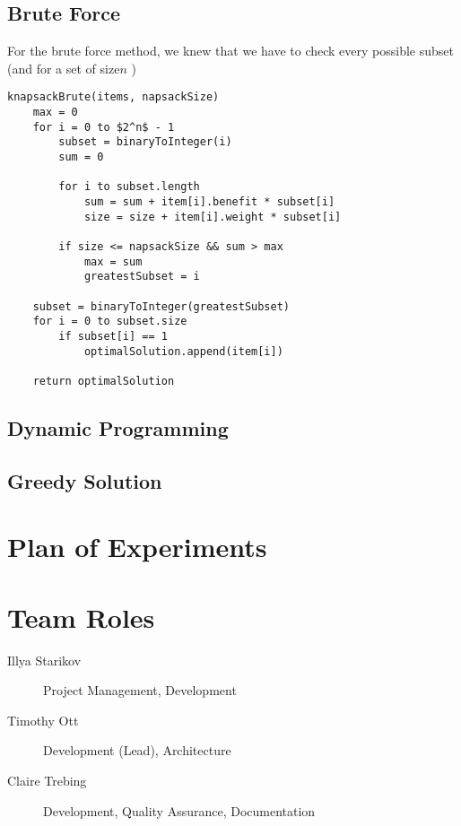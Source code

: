 \documentclass{article}
\begin{document}
\subsection{Brute Force}
For the brute force method, we knew that we have to check every possible subset (and for a set of size$n$ )

\begin{lstlisting}[mathescape]
knapsackBrute(items, napsackSize)
    max = 0
    for i = 0 to $2^n$ - 1
        subset = binaryToInteger(i)
        sum = 0

        for i to subset.length
            sum = sum + item[i].benefit * subset[i]
            size = size + item[i].weight * subset[i]

        if size <= napsackSize && sum > max
            max = sum
            greatestSubset = i

    subset = binaryToInteger(greatestSubset)
    for i = 0 to subset.size
        if subset[i] == 1
            optimalSolution.append(item[i])

    return optimalSolution
\end{lstlisting}
\subsection{Dynamic Programming}
\subsection{Greedy Solution}


\section{Plan of Experiments}


\section{Team Roles}
\begin{description}
    \item [Illya Starikov] Project Management, Development
    \item [Timothy Ott] Development (Lead), Architecture
    \item [Claire Trebing] Development, Quality Assurance,  Documentation
\end{description}
\end{document}
